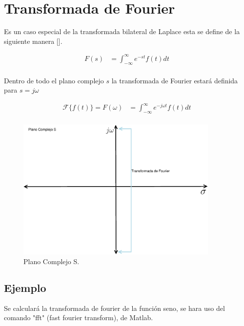 \documentclass[12pt]{article}
\begin{document}
\section{Transformada de Fourier}
Es un caso especial de la transformada bilateral de Laplace esta se define de la siguiente manera [\cite{lago1984teoria}].

\begin{equation}
    \begin{split}
        F(s)&=\int _{-\infty}^{\infty} e^{-st}f(t)dt\\
    \end{split}
    \label{eq:bilate_laplace}
\end{equation}

Dentro de todo el plano complejo $s$ la transformada de Fourier estará definida para $s=j\omega$ 

\begin{equation}
    \begin{split}
        \mathscr{F}\{f(t)\}=F(\omega)&=\int _{-\infty}^{\infty} e^{-j\omega t}f(t)dt\\
    \end{split}
    \label{eq:fourier_trans}
\end{equation}

\begin{figure}[h]
    \centering
        \includegraphics[width=10cm]{IMAGENES/Diagram1.eps}
        \caption{Plano Complejo S.}
\end{figure}
\subsection{Ejemplo}
Se calculará la transformada de fourier de la función seno, se hara uso del comando "fft" (fast fourier transform), de Matlab.


\end{document}
